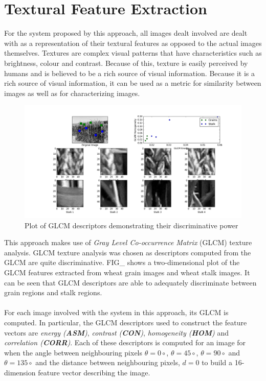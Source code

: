 \section{Textural Feature Extraction}
For the system proposed by this approach, all images dealt involved are dealt with as a representation of their textural features as opposed to the actual images themselves. Textures are complex visual patterns that have characteristics such as brightness, colour and contrast. Because of this, texture is easily perceived by humans and is believed to be a rich source of visual information. Because it is a rich source of visual information, it can be used as a metric for similarity between images as well as for characterizing images. 
\begin{figure}[ht!]
\centering
\includegraphics[scale=0.3]{glcm_1}
\caption{Plot of GLCM descriptors demonstrating their discriminative power}
\label{fig1}
\end{figure}
This approach makes use of \textit{Gray Level Co-occurrence Matrix} (GLCM) texture analysis. GLCM texture analysis was chosen as descriptors computed from the GLCM are quite discriminative. FIG\_ shows a two-dimensional plot of the GLCM features extracted from wheat grain images and wheat stalk images. It can be seen that GLCM descriptors are able to adequately discriminate between grain regions and stalk regions.\\ \\
%
For each image involved with the system in this approach, its GLCM is computed. In particular, the GLCM descriptors used to construct the feature vectors are \textit{energy (\textbf{ASM})}, \textit{contrast (\textbf{CON})}, \textit{homogeneity (\textbf{HOM})} and \textit{correlation (\textbf{CORR})}. Each of these descriptors is computed for an image for when the angle between neighbouring pixels $\theta = 0\circ$, $\theta = 45\circ$, $\theta = 90\circ$ and $\theta = 135\circ$ and the distance between neighbouring pixels, $d = 0$ to build a 16-dimension feature vector describing the image.

